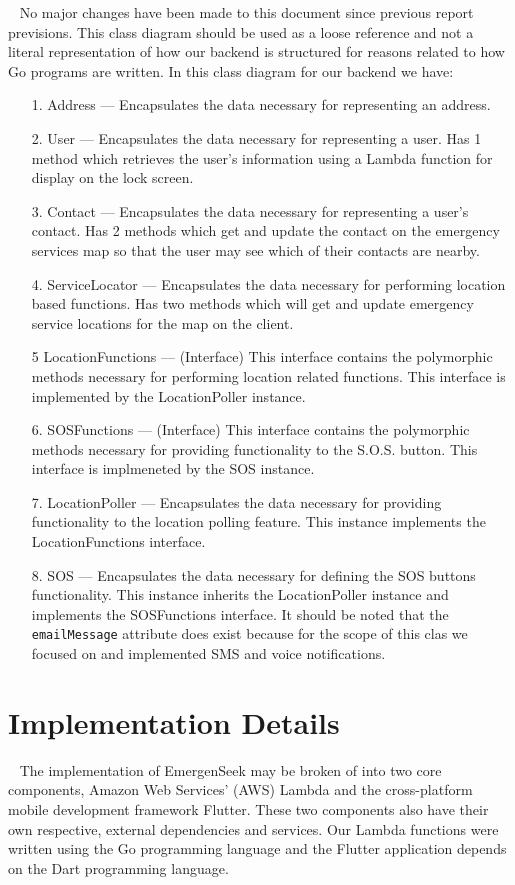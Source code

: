 \documentclass[10pt, a4paper]{article}
\begin{document}
\par ~ No major changes have been made to this document since previous report previsions. This class diagram should be used as a loose reference and not a literal representation of how our backend is structured for reasons related to how Go programs are written. In this class diagram for our backend we have:
\begin{enumerate}
	\item[1.] Address --- Encapsulates the data necessary for representing an address.
	\item[2.] User --- Encapsulates the data necessary for representing a user. Has 1 method which retrieves the user's information using a Lambda function for display on the lock screen.
	\item[3.] Contact --- Encapsulates the data necessary for representing a user's contact. Has 2 methods which get and update the contact on the emergency services map so that the user may see which of their contacts are nearby.
	\item[4.] ServiceLocator --- Encapsulates the data necessary for performing location based functions. Has two methods which will get and update emergency service locations for the map on the client.
	\item[5] LocationFunctions --- (Interface) This interface contains the polymorphic methods necessary for performing location related functions. This interface is implemented by the LocationPoller instance.
	\item[6.] SOSFunctions --- (Interface) This interface contains the polymorphic methods necessary for providing functionality to the S.O.S. button. This interface is implmeneted by the SOS instance.
	\item[7.] LocationPoller --- Encapsulates the data necessary for providing functionality to the location polling feature. This instance implements the LocationFunctions interface.
	\item[8.] SOS --- Encapsulates the data necessary for defining the SOS buttons functionality. This instance inherits the LocationPoller instance and implements the SOSFunctions interface. It should be noted that the \texttt{emailMessage} attribute does exist because for the scope of this clas we focused on and implemented SMS and voice notifications.
\end{enumerate}

\section{Implementation Details}
\par ~ The implementation of EmergenSeek may be broken of into two core components, Amazon Web Services' (AWS) Lambda and the cross-platform mobile development framework Flutter. These two components also have their own respective, external dependencies and services. Our Lambda functions were written using the Go programming language and the Flutter application depends on the Dart programming language. 
\end{document}
